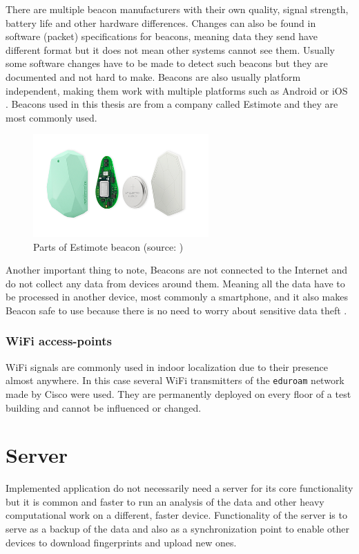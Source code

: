There are multiple beacon manufacturers with their own quality, signal strength, battery life and other hardware differences. Changes can also be found in software (packet) specifications for beacons, meaning data they send have different format but it does not mean other systems cannot see them. Usually some software changes have to be made to detect such beacons but they are documented and not hard to make. Beacons are also usually platform independent, making them work with multiple platforms such as Android or iOS \cite{IPSBOBLE, 10TABB}. Beacons used in this thesis are from a company called Estimote and they are most commonly used.

\begin{figure}[H]
	\begin{centering}
		\includegraphics[width=0.6\textwidth]{img/estimote_beacon}
		\par\end{centering}
	\caption{Parts of Estimote beacon (source: \cite{RMPFEB})\label{fig:PartsOfEstimoteBeacon}}
	\label{fig10}
\end{figure}

Another important thing to note, Beacons are not connected to the Internet and do not collect any data from devices around them. Meaning all the data have to be processed in another device, most commonly a smartphone, and it also makes Beacon safe to use because there is no need to worry about sensitive data theft \cite{10TABB}.

\subsubsection{WiFi access-points}\label{subsec:WiFi access-points}
WiFi signals are commonly used in indoor localization due to their presence almost anywhere. In this case several WiFi transmitters of the \verb|eduroam| network made by Cisco were used. They are permanently deployed on every floor of a test building and cannot be influenced or changed.

\section{Server}\label{sec:Server}
Implemented application do not necessarily need a server for its core functionality but it is common and faster to run an analysis of the data and other heavy computational work on a different, faster device. Functionality of the server is to serve as a backup of the data and also as a synchronization point to enable other devices to download fingerprints and upload new ones.

